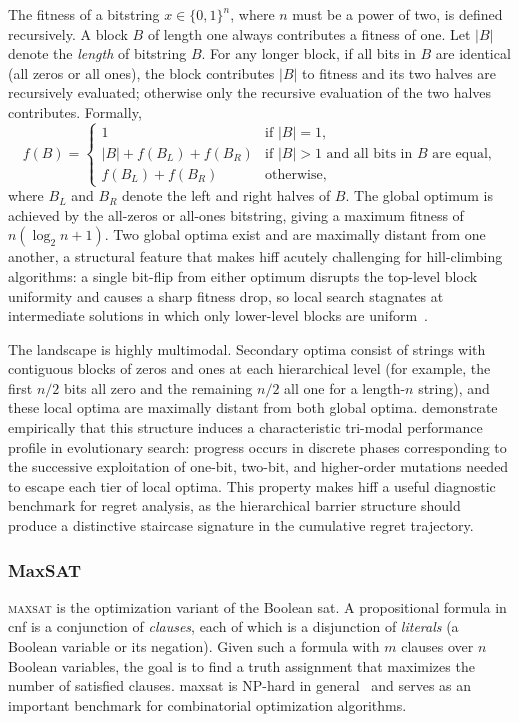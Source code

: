 The fitness of a bitstring $x \in \{0,1\}^n$, where $n$ must be a
power of two, is defined recursively. A block $B$ of length one
always contributes a fitness of one.
Let $|B|$ denote the \emph{length} of bitstring $B$. For any
longer block, if all
bits in $B$ are identical (all zeros or all ones), the block
contributes $|B|$ to fitness and its two halves are recursively
evaluated; otherwise only the recursive evaluation of the two halves
contributes. Formally,
\[
  f(B) =
  \begin{cases}
    1 & \text{if } |B| = 1, \\
    |B| + f(B_L) + f(B_R) & \text{if } |B| > 1 \text{ and all bits
    in } B \text{ are equal,} \\
    f(B_L) + f(B_R) & \text{otherwise,}
  \end{cases}
\]
where $B_L$ and $B_R$ denote the left and right halves of $B$.
The global optimum is achieved by the all-zeros or all-ones
bitstring, giving a maximum fitness of $n(\log_2 n + 1)$. Two
global optima exist and are maximally distant from one another,
a structural feature that makes \acrshort{hiff} acutely challenging
for hill-climbing algorithms: a single bit-flip from either optimum
disrupts the top-level block uniformity and causes a sharp fitness
drop, so local search stagnates at intermediate solutions in which
only lower-level blocks are uniform~\cite{watson1998modeling}.

The landscape is highly multimodal. Secondary optima consist of
strings with contiguous blocks of zeros and ones at each
hierarchical level (for example, the first $n/2$ bits all zero and
the remaining $n/2$ all one for a length-$n$ string), and these
local optima are maximally distant from both global optima.
\citet{oates2000triphase} demonstrate empirically that
this structure induces a characteristic tri-modal performance profile
in evolutionary search: progress occurs in discrete phases
corresponding to the successive exploitation of one-bit, two-bit,
and higher-order mutations needed to escape each tier of local
optima. This property makes \acrshort{hiff} a useful diagnostic
benchmark for regret analysis, as the hierarchical barrier structure
should produce a distinctive staircase signature in the cumulative
regret trajectory.

\subsubsection{MaxSAT}
\textsc{\acrfull{maxsat}} is the optimization variant
of the Boolean \acrfull{sat}. A propositional formula
in \acrfull{cnf} is a conjunction of
\textit{clauses}, each of which is a disjunction of \textit{literals}
(a Boolean variable or its negation). Given such a formula with $m$
clauses over $n$ Boolean variables, the goal is to find a truth
assignment that maximizes the number of satisfied clauses. \acrshort{maxsat} is
NP-hard in general~\cite{hutchison_search_2004} and serves as an
important benchmark for combinatorial optimization algorithms.

